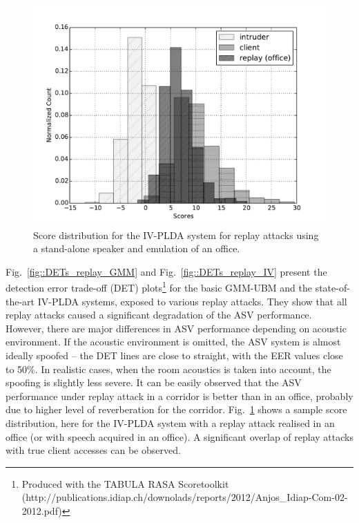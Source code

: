 \begin{figure}
	\centering
	\begin{minipage}{.5\textwidth}
	\includegraphics[width=1\linewidth]{Figs/dist_IV_off.pdf}
	\end{minipage}

%

	\caption{Score distribution for the IV-PLDA system for replay attacks using a stand-alone speaker and emulation of an office.}
	\label{fig::Dist_IV}
\end{figure}

Fig.~\ref{fig::DETs_replay_GMM} and Fig.~\ref{fig::DETs_replay_IV} present the detection error trade-off (DET) plots\footnote{Produced with the TABULA RASA Scoretoolkit (http://publications.idiap.ch/downolads/reports/2012/Anjos\_Idiap-Com-02-2012.pdf)}  for the basic GMM-UBM and the state-of-the-art IV-PLDA systems, exposed to various replay attacks. They show that all replay attacks caused a significant degradation of the ASV performance. However, there are major differences in ASV performance depending on acoustic environment. If the acoustic environment is omitted, the ASV system is almost ideally spoofed -- the DET lines are close to straight, with the EER values close to 50\%. In realistic cases, when the room acoustics is taken into account, the spoofing is slightly less severe. It can be easily observed that the ASV performance under replay attack in a corridor is better than in an office, probably due to higher level of reverberation for the corridor. Fig.~\ref{fig::Dist_IV} shows a sample score distribution, here for the IV-PLDA system with a replay attack realised in an office (or with speech acquired in an office). A significant overlap of replay attacks with true client accesses can be observed.


